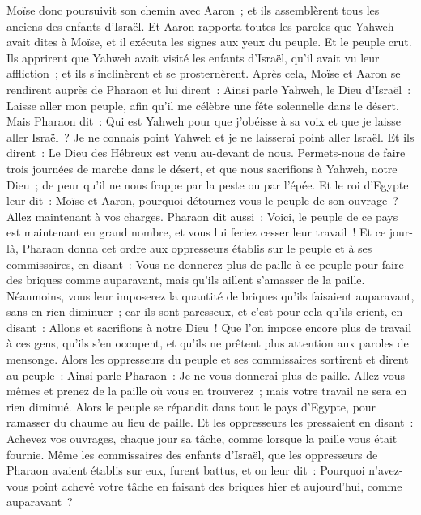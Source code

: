 \begin{multicols}{2}
Moïse donc poursuivit son chemin avec Aaron~; et ils assemblèrent tous les anciens des enfants d'Israël.
Et Aaron rapporta toutes les paroles que Yahweh avait dites à Moïse, et il exécuta les signes aux yeux du peuple.
Et le peuple crut. Ils apprirent que Yahweh avait visité les enfants d'Israël, qu'il avait vu leur affliction~; et ils s'inclinèrent et se prosternèrent.
\VerseOne{}Après cela, Moïse et Aaron se rendirent auprès de Pharaon et lui dirent~: Ainsi parle Yahweh, le Dieu d'Israël~: Laisse aller mon peuple, afin qu'il me célèbre une fête solennelle dans le désert.
Mais Pharaon dit~: Qui est Yahweh pour que j'obéisse à sa voix et que je laisse aller Israël~? Je ne connais point Yahweh et je ne laisserai point aller Israël.
Et ils dirent~: Le Dieu des Hébreux est venu au-devant de nous. Permets-nous de faire trois journées de marche dans le désert, et que nous sacrifions à Yahweh, notre Dieu~; de peur qu'il ne nous frappe par la peste ou par l'épée.
Et le roi d'Egypte leur dit~: Moïse et Aaron, pourquoi détournez-vous le peuple de son ouvrage~? Allez maintenant à vos charges.
Pharaon dit aussi~: Voici, le peuple de ce pays est maintenant en grand nombre, et vous lui feriez cesser leur travail~!
Et ce jour-là, Pharaon donna cet ordre aux oppresseurs établis sur le peuple et à ses commissaires, en disant~:
Vous ne donnerez plus de paille à ce peuple pour faire des briques comme auparavant, mais qu'ils aillent s'amasser de la paille.
Néanmoins, vous leur imposerez la quantité de briques qu'ils faisaient auparavant, sans en rien diminuer~; car ils sont paresseux, et c'est pour cela qu'ils crient, en disant~: Allons et sacrifions à notre Dieu~!
Que l'on impose encore plus de travail à ces gens, qu'ils s'en occupent, et qu’ils ne prêtent plus attention aux paroles de mensonge.
Alors les oppresseurs du peuple et ses commissaires sortirent et dirent au peuple~: Ainsi parle Pharaon~: Je ne vous donnerai plus de paille.
Allez vous-mêmes et prenez de la paille où vous en trouverez~; mais votre travail ne sera en rien diminué.
Alors le peuple se répandit dans tout le pays d'Egypte, pour ramasser du chaume au lieu de paille.
Et les oppresseurs les pressaient en disant~: Achevez vos ouvrages, chaque jour sa tâche, comme lorsque la paille vous était fournie.
Même les commissaires des enfants d'Israël, que les oppresseurs de Pharaon avaient établis sur eux, furent battus, et on leur dit~: Pourquoi n'avez-vous point achevé votre tâche en faisant des briques hier et aujourd'hui, comme auparavant~?

\end{multicols}
